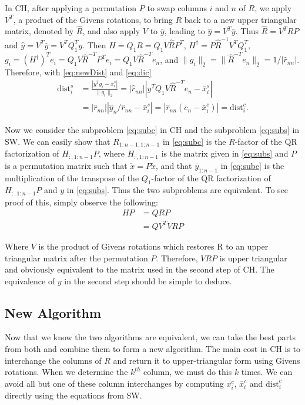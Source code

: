 \documentclass[12pt,Bold,letterpaper]{mcgilletdclass}
\newcommand{\dist}{\mathrm{dist}}
\newcommand{\vsp}{\vspace{\baselineskip}}
\begin{document}
In CH, after applying a permutation $P$ to swap columns $i$ and $n$ of $R$,  
we apply $V^T$, a product of the Givens rotations, to bring $R$ back to a new upper triangular
matrix, denoted by $\hat{R}$, and also apply $V$ to $\bar{y}$, 
leading to  $\hat{y} = V^T\bar{y}$. 
Thus  $\hat{R}=V^T RP$ and $\hat{y} = V^T\bar{y}=V^TQ_1^Ty$. 
Then $H=Q_1R= Q_1V\hat{R}P^T$, $H^\dag= P\hat{R}^{-1}V^TQ_1^T$, 
$g_i=(H^\dag)^Te_i=Q_1V\hat{R}^{-T}P^Te_i=Q_1V\hat{R}^{-T}e_n$,
and $\|g_i\|_2=\|\hat{R}^{-T}e_n\|_2=1/|\hat{r}_{nn}|$.
Therefore, with \eqref{eq:newDist} and \eqref{eq:dic}
\begin{align}
\dist_i^s
&=\frac{ | y^Tg_i - \bar{x}_i^s   |}{  \| g_i   \|_2} 
=|\hat{r}_{nn}||y^TQ_1V\hat{R}^{-T}e_n- \bar{x}_i^s  |  \label{eq:disc} \\
& = |\hat{r}_{nn}|| \hat{y}_n/\hat{r}_{nn} - \bar{x}_i^s | 
 = |\hat{r}_{nn}(c_n-\bar{x}_i^c)| =\dist_i^c.  \nonumber
\end{align}

Now we consider  the subproblem \eqref{eq:subc} in CH and the subproblem \eqref{eq:subs} in SW.
We can easily show that $R_{1:n-1,1:n-1}$ in  \eqref{eq:subc} is the $R$-factor of the QR factorization
of $H_{:,1:n-1}P$, where $H_{:,1:n-1}$ is the matrix given in \eqref{eq:subs}
and $P$ is a permutation matrix such that $\check{x}=P\tilde{x}$,
and that $\bar{y}_{1:n-1}$ in  \eqref{eq:subc} is the multiplication of the transpose of 
the $Q_1$-factor of the QR factorization of $H_{:,1:n-1}P$ and $y$ in \eqref{eq:subs}.
Thus the two subproblems are equivalent. To see proof of this, simply observe the following:
\begin{align}
HP &= QRP \\
&=QV^TVRP
\end{align}

Where $V$ is the product of Givens rotations which restores R to an upper triangular matrix after the permutation $P$. Therefore, $VRP$ is upper triangular and obviously equivalent to the matrix used in the second step of CH. The equivalence of $y$ in the second step should be simple to deduce.

\vsp \subsection{New Algorithm} \label{subsec:newReduction}
Now that we know the two algorithms are equivalent, we can take the best
parts from both and combine them to form a new algorithm. 
The main cost in CH is to interchange the columns of $R$ and return it to
upper-triangular form using Givens rotations. 
When we determine the $k^{th}$ column,  we must do this $k$ times. 
We can avoid all but one of these column interchanges by computing $x_i^c$, 
$\bar{x}_i^c$ and $\dist_i^c$ directly using the equations from SW. 
\end{document}
